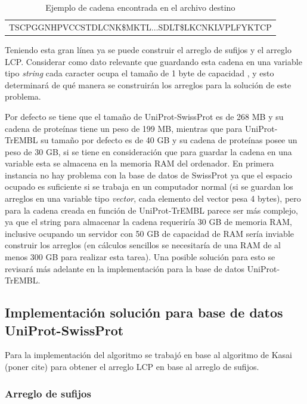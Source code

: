 \begin{table}[h]
\centering
\label{propuesta-23}
\begin{tabular}{c}
TSCPGGNHPVCCSTDLCNK\$MKTL$\ldots$SDLT\$LKCNKLVPLFYKTCP\\ 
\end{tabular}
\caption{Ejemplo de cadena encontrada en el archivo destino}
\end{table}

Teniendo esta gran línea ya se puede construir el arreglo de sufijos y el arreglo LCP. Considerar como dato relevante que guardando esta cadena en una variable tipo \textit{string} cada caracter ocupa el tamaño de 1 byte de capacidad \cite{manipulatingstrings}, y esto determinará de qué manera se construirán los arreglos para la solución de este problema.

Por defecto se tiene que el tamaño de UniProt-SwissProt es de 268 MB y su cadena de proteínas tiene un peso de 199 MB, mientras que para UniProt-TrEMBL su tamaño por defecto es de 40 GB y su cadena de proteínas posee un peso de 30 GB, si se tiene en consideración que para guardar la cadena en una variable esta se almacena en la memoria RAM del ordenador. En primera instancia no hay problema con la base de datos de SwissProt ya que el espacio ocupado es suficiente si se trabaja en un computador normal (si se guardan los arreglos en una variable tipo \textit{vector}, cada elemento del vector pesa 4 bytes), pero para la cadena creada en función de UniProt-TrEMBL parece ser más complejo, ya que el string para almacenar la cadena requeriría 30 GB de memoria RAM, inclusive ocupando un servidor con 50 GB de capacidad de RAM sería inviable construir los arreglos (en cálculos sencillos se necesitaría de una RAM de al menos 300 GB para realizar esta tarea). Una posible solución para esto se revisará más adelante en la implementación para la base de datos UniProt-TrEMBL.

\subsection{Implementación solución para base de datos UniProt-SwissProt}

Para la implementación del algoritmo se trabajó en base al algoritmo de Kasai (poner cite) para obtener el arreglo LCP en base al arreglo de sufijos.

\subsubsection{Arreglo de sufijos}

